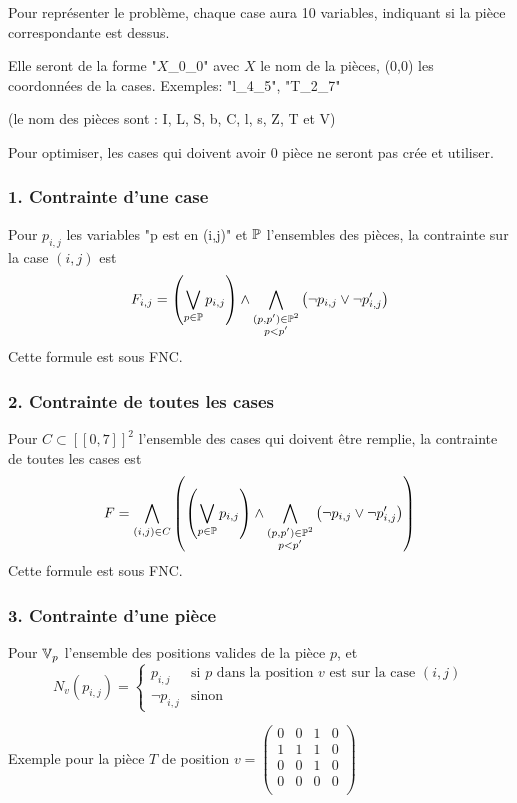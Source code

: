     Pour représenter le problème, chaque case aura 10 variables,
    indiquant si la pièce correspondante est dessus.
    
    Elle seront de la forme "$X$\_0\_0" avec $X$ le nom de la pièces,
    (0,0) les coordonnées de la cases.
    Exemples: "l\_4\_5", "T\_2\_7"
    
    (le nom des pièces sont : I, L, S, b, C, l, s, Z, T et V)
    
    Pour optimiser, les cases qui doivent avoir 0 pièce ne seront pas crée et utiliser.
    
    \subsubsection*{1. Contrainte d'une case}
    Pour $p_{i,j}$ les variables "p est en (i,j)" et $\mathbb{P}$ l'ensembles des pièces,
    la contrainte sur la case $(i,j)$ est
    \[F_{i,j} = \left(\bigvee_{p\in\mathbb{P}} p_{i,j} \right) \land
        \bigwedge_{\substack{(p,p')\in\mathbb{P}^2\\p<p'}}\left(\lnot p_{i,j} \lor \lnot p'_{i,j}\right)\]
    Cette formule est sous FNC.
    
    \subsubsection*{2. Contrainte de toutes les cases}
    Pour $C \subset [\![0,7]\!]^2$ l'ensemble des cases qui doivent être remplie,
    la contrainte de toutes les cases est
    \[F = \bigwedge_{(i,j)\in C} \left(\left(\bigvee_{p\in\mathbb{P}} p_{i,j} \right) \land
        \bigwedge_{\substack{(p,p')\in\mathbb{P}^2\\p<p'}}\left(\lnot p_{i,j} \lor \lnot p'_{i,j}\right)\right)\]
    Cette formule est sous FNC.
    
    \subsubsection*{3. Contrainte d'une pièce}
    Pour $\mathbb{V}_p$ l'ensemble des positions valides de la pièce $p$,
    et
    \[N_v(p_{i,j}) = \begin{cases}
        p_{i,j} & \text{si $p$ dans la position $v$ est sur la case $(i,j)$}\\
        \lnot p_{i,j} & \text{sinon}
    \end{cases}\]
    
    Exemple pour la pièce $T$ de position $v =
    \begin{pmatrix}
        0 & 0 & 1 & 0 \\
        1 & 1 & 1 & 0 \\
        0 & 0 & 1 & 0 \\
        0 & 0 & 0 & 0 \\
    \end{pmatrix}$
    
